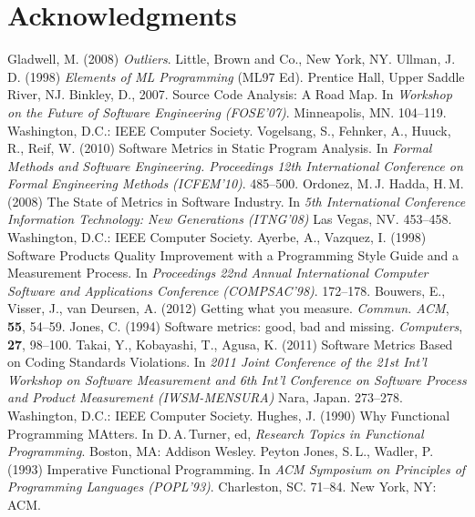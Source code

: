 \documentclass[12pt,abstracton]{scrartcl}
\begin{document}
\section*{Acknowledgments}
\begin{thebibliography}{99}
 Gladwell, M. (2008) \emph{Outliers}. Little, Brown and Co., New York, NY.
 Ullman, J.\,D. (1998) \emph{Elements of ML Programming} (ML97 Ed). Prentice Hall, Upper Saddle River, NJ.
 Binkley, D., 2007. Source Code Analysis: A Road Map. In \emph{Workshop on the Future of Software Engineering (FOSE'07)}. Minneapolis, MN. 104--119. Washington, D.C.: IEEE Computer Society.
 Vogelsang, S., Fehnker, A., Huuck, R., Reif, W. (2010) Software Metrics in Static Program Analysis. In \emph{Formal Methods and Software Engineering. Proceedings 12th International Conference on Formal Engineering Methods (ICFEM'10)}. 485--500.
 Ordonez, M.\,J. Hadda, H.\,M. (2008) The State of Metrics in Software Industry. In \emph{5th International Conference Information Technology: New Generations (ITNG'08)} Las Vegas, NV. 453--458. Washington, D.C.: IEEE Computer Society.
 Ayerbe, A., Vazquez, I. (1998) Software Products Quality Improvement with a Programming Style Guide and a Measurement Process. In \emph{Proceedings 22nd Annual International Computer Software and Applications Conference (COMPSAC'98)}. 172--178.
 Bouwers, E., Visser, J., van Deursen, A. (2012) Getting what you measure. \emph{Commun. ACM}, \textbf{55}, 54--59.
 Jones, C. (1994) Software metrics: good, bad and missing. \emph{Computers}, \textbf{27}, 98--100.
 Takai, Y., Kobayashi, T., Agusa, K. (2011) Software Metrics Based on Coding Standards Violations. In \emph{2011 Joint Conference of the 21st Int'l Workshop on Software Measurement and 6th Int'l Conference on Software Process and Product Measurement (IWSM-MENSURA)} Nara, Japan. 273--278. Washington, D.C.: IEEE Computer Society.
 Hughes, J. (1990) Why Functional Programming MAtters. In D.\,A.\,Turner, ed, \emph{Research Topics in Functional Programming}. Boston, MA: Addison Wesley.
 Peyton Jones, S.\,L., Wadler, P. (1993) Imperative Functional Programming. In \emph{ACM Symposium on Principles of Programming Languages (POPL'93)}. Charleston, SC. 71--84. New York, NY: ACM.
\end{thebibliography}
\end{document}
